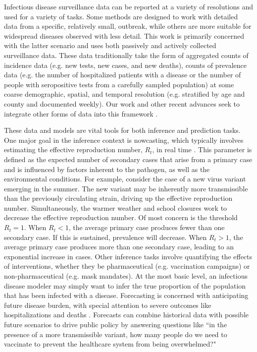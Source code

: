 Infectious disease surveillance data can be reported at a variety of resolutions and used for a variety of tasks.
Some methods are designed to work with detailed data from a specific, relatively small, outbreak, while others are more suitable for widespread diseases observed with less detail.
This work is primarily concerned with the latter scenario and uses both passively and actively collected surveillance data.
These data traditionally take the form of aggregated counts of incidence data (e.g. new tests, new cases, and new deaths), counts of prevalence data (e.g. the number of hospitalized patients with a disease or the number of people with seropositive tests from a carefully sampled population) at some coarse demographic, spatial, and temporal resolution (e.g. stratified by age and county and documented weekly).
Our work and other recent advances seek to integrate other forms of data into this framework \citep{Tang2022, Rasmussen2011}.

These data and models are vital tools for both inference and prediction tasks.
One major goal in the inference context is nowcasting, which typically involves estimating the effective reproduction number, \( R_t \), in real time \citep{10.1093/aje/kwt133}.
This parameter is defined as the expected number of secondary cases that arise from a primary case and is influenced by factors inherent to the pathogen, as well as the environmental conditions.
For example, consider the case of a new virus variant emerging in the summer.
The new variant may be inherently more transmissible than the previously circulating strain, driving up the effective reproduction number.
Simultaneously, the warmer weather and school closures work to decrease the effective reproduction number.
Of most concern is the threshold \( R_t = 1 \).
When \( R_t < 1 \), the average primary case produces fewer than one secondary case.
If this is sustained, prevalence will decrease.
When \( R_t > 1 \), the average primary case produces more than one secondary case, leading to an exponential increase in cases.
Other inference tasks involve quantifying the effects of interventions, whether they be pharmaceutical (e.g. vaccination campaigns) or non-pharmaceutical (e.g. mask mandates).
At the most basic level, an infectious disease modeler may simply want to infer the true proportion of the population that has been infected with a disease.
Forecasting is concerned with anticipating future disease burden, with special attention to severe outcomes like hospitalizations and deaths \citep{10.1371/journal.pmed.1003793}.
Forecasts can combine historical data with possible future scenarios to drive public policy by answering questions like ``in the presence of a more transmissible variant, how many people do we need to vaccinate to prevent the healthcare system from being overwhelmed?"

